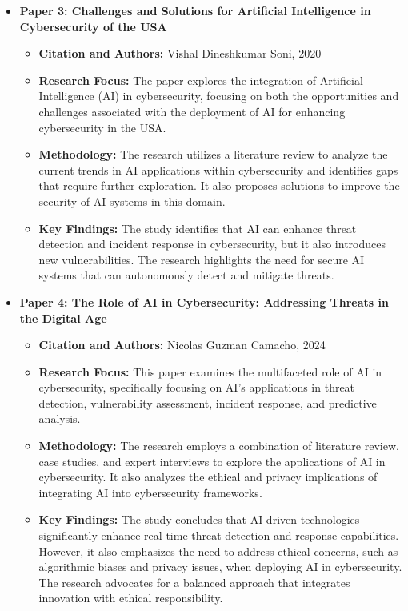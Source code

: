 \documentclass[12pt]{article}
\begin{document}
\begin{itemize}
    \item \textbf{Paper 3: Challenges and Solutions for Artificial Intelligence in Cybersecurity of the USA}
    \begin{itemize}
        \item \textbf{Citation and Authors:} Vishal Dineshkumar Soni, 2020
        \item \textbf{Research Focus:} The paper explores the integration of Artificial Intelligence (AI) in cybersecurity, focusing on both the opportunities and challenges associated with the deployment of AI for enhancing cybersecurity in the USA.
        \item \textbf{Methodology:} The research utilizes a literature review to analyze the current trends in AI applications within cybersecurity and identifies gaps that require further exploration. It also proposes solutions to improve the security of AI systems in this domain.
        \item \textbf{Key Findings:} The study identifies that AI can enhance threat detection and incident response in cybersecurity, but it also introduces new vulnerabilities. The research highlights the need for secure AI systems that can autonomously detect and mitigate threats.
    \end{itemize}
    
    \item \textbf{Paper 4: The Role of AI in Cybersecurity: Addressing Threats in the Digital Age}
    \begin{itemize}
    \item \textbf{Citation and Authors:} Nicolas Guzman Camacho, 2024
    \item \textbf{Research Focus:} This paper examines the multifaceted role of AI in cybersecurity, specifically focusing on AI’s applications in threat detection, vulnerability assessment, incident response, and predictive analysis.
    \item \textbf{Methodology:} The research employs a combination of literature review, case studies, and expert interviews to explore the applications of AI in cybersecurity. It also analyzes the ethical and privacy implications of integrating AI into cybersecurity frameworks.
    \item \textbf{Key Findings:} The study concludes that AI-driven technologies significantly enhance real-time threat detection and response capabilities. However, it also emphasizes the need to address ethical concerns, such as algorithmic biases and privacy issues, when deploying AI in cybersecurity. The research advocates for a balanced approach that integrates innovation with ethical responsibility.
    \end{itemize}
\end{itemize}
\end{document}
